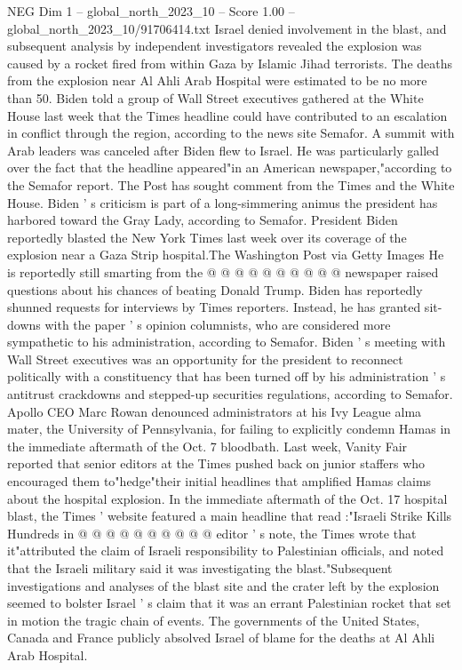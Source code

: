\begin{textsample}{NEG Dim 1 – global\_north\_2023\_10 – Score 1.00 – global\_north\_2023\_10/91706414.txt}  \label{ex:f1_neg_137}
Israel denied involvement in the blast, and subsequent analysis by independent investigators revealed the explosion was caused by a rocket fired from within Gaza by Islamic Jihad terrorists.
The deaths from the explosion near Al Ahli Arab Hospital were estimated to be no more than 50.
Biden told a group of Wall Street executives gathered at the White House last week that the Times headline could have contributed to an escalation in conflict through the region, according to the news site Semafor.
A summit with Arab leaders was canceled after Biden flew to Israel.
He was particularly galled over the fact that the headline appeared"in an American newspaper,"according to the Semafor report.
The Post has sought comment from the Times and the White House.
Biden ' s criticism is part of a long-simmering animus the president has harbored toward the Gray Lady, according to Semafor.
President Biden reportedly blasted the New York Times last week over its coverage of the explosion near a Gaza Strip hospital.The Washington Post via Getty Images He is reportedly still smarting from the @ @ @ @ @ @ @ @ @ @ newspaper raised questions about his chances of beating Donald Trump.
Biden has reportedly shunned requests for interviews by Times reporters.
Instead, he has granted sit-downs with the paper ' s opinion columnists, who are considered more sympathetic to his administration, according to Semafor.
Biden ' s meeting with Wall Street executives was an opportunity for the president to reconnect politically with a constituency that has been turned off by his administration ' s antitrust crackdowns and stepped-up securities regulations, according to Semafor.
Apollo CEO Marc Rowan denounced administrators at his Ivy League alma mater, the University of Pennsylvania, for failing to explicitly condemn Hamas in the immediate aftermath of the Oct. 7 bloodbath.
Last week, Vanity Fair reported that senior editors at the Times pushed back on junior staffers who encouraged them to"hedge"their initial headlines that amplified Hamas claims about the hospital explosion.
In the immediate aftermath of the Oct. 17 hospital blast, the Times ' website featured a main headline that read :"Israeli Strike Kills Hundreds in @ @ @ @ @ @ @ @ @ @ editor ' s note, the Times wrote that it"attributed the claim of Israeli responsibility to Palestinian officials, and noted that the Israeli military said it was investigating the blast."Subsequent investigations and analyses of the blast site and the crater left by the explosion seemed to bolster Israel ' s claim that it was an errant Palestinian rocket that set in motion the tragic chain of events.
The governments of the United States, Canada and France publicly absolved Israel of blame for the deaths at Al Ahli Arab Hospital.

\end{textsample}
